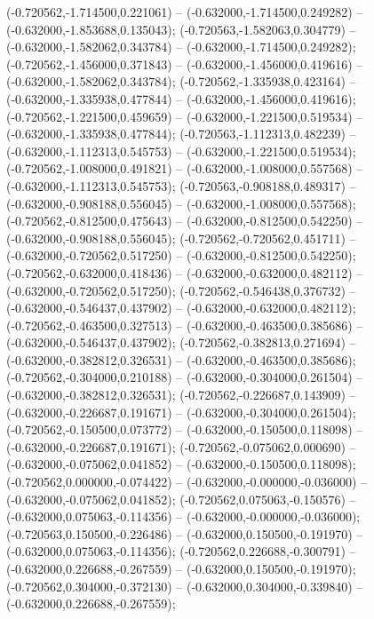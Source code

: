  (-0.720562,-1.714500,0.221061) -- (-0.632000,-1.714500,0.249282) -- (-0.632000,-1.853688,0.135043);
 (-0.720563,-1.582063,0.304779) -- (-0.632000,-1.582062,0.343784) -- (-0.632000,-1.714500,0.249282);
 (-0.720562,-1.456000,0.371843) -- (-0.632000,-1.456000,0.419616) -- (-0.632000,-1.582062,0.343784);
 (-0.720562,-1.335938,0.423164) -- (-0.632000,-1.335938,0.477844) -- (-0.632000,-1.456000,0.419616);
 (-0.720562,-1.221500,0.459659) -- (-0.632000,-1.221500,0.519534) -- (-0.632000,-1.335938,0.477844);
 (-0.720563,-1.112313,0.482239) -- (-0.632000,-1.112313,0.545753) -- (-0.632000,-1.221500,0.519534);
 (-0.720562,-1.008000,0.491821) -- (-0.632000,-1.008000,0.557568) -- (-0.632000,-1.112313,0.545753);
 (-0.720563,-0.908188,0.489317) -- (-0.632000,-0.908188,0.556045) -- (-0.632000,-1.008000,0.557568);
 (-0.720562,-0.812500,0.475643) -- (-0.632000,-0.812500,0.542250) -- (-0.632000,-0.908188,0.556045);
 (-0.720562,-0.720562,0.451711) -- (-0.632000,-0.720562,0.517250) -- (-0.632000,-0.812500,0.542250);
 (-0.720562,-0.632000,0.418436) -- (-0.632000,-0.632000,0.482112) -- (-0.632000,-0.720562,0.517250);
 (-0.720562,-0.546438,0.376732) -- (-0.632000,-0.546437,0.437902) -- (-0.632000,-0.632000,0.482112);
 (-0.720562,-0.463500,0.327513) -- (-0.632000,-0.463500,0.385686) -- (-0.632000,-0.546437,0.437902);
 (-0.720562,-0.382813,0.271694) -- (-0.632000,-0.382812,0.326531) -- (-0.632000,-0.463500,0.385686);
 (-0.720562,-0.304000,0.210188) -- (-0.632000,-0.304000,0.261504) -- (-0.632000,-0.382812,0.326531);
 (-0.720562,-0.226687,0.143909) -- (-0.632000,-0.226687,0.191671) -- (-0.632000,-0.304000,0.261504);
 (-0.720562,-0.150500,0.073772) -- (-0.632000,-0.150500,0.118098) -- (-0.632000,-0.226687,0.191671);
 (-0.720562,-0.075062,0.000690) -- (-0.632000,-0.075062,0.041852) -- (-0.632000,-0.150500,0.118098);
 (-0.720562,0.000000,-0.074422) -- (-0.632000,-0.000000,-0.036000) -- (-0.632000,-0.075062,0.041852);
 (-0.720562,0.075063,-0.150576) -- (-0.632000,0.075063,-0.114356) -- (-0.632000,-0.000000,-0.036000);
 (-0.720563,0.150500,-0.226486) -- (-0.632000,0.150500,-0.191970) -- (-0.632000,0.075063,-0.114356);
 (-0.720562,0.226688,-0.300791) -- (-0.632000,0.226688,-0.267559) -- (-0.632000,0.150500,-0.191970);
 (-0.720562,0.304000,-0.372130) -- (-0.632000,0.304000,-0.339840) -- (-0.632000,0.226688,-0.267559);
